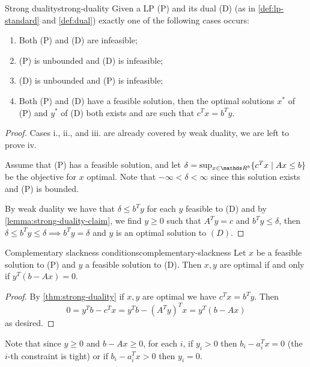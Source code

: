 \documentclass[12pt]{extarticle}
\begin{document}
\begin{theorem}{Strong duality}{strong-duality}
	Given a LP (P) and its dual (D) (as in \cref{def:lp-standard} and \cref{def:dual})
	exactly one of the following cases occurs:
	\begin{enumerate}[label=\roman*.]
		\item Both (P) and (D) are infeasible;
		\item (P) is unbounded and (D) is infeasible;
		\item (D) is unbounded and (P) is infeasible;
		\item Both (P) and (D) have a feasible solution, then the optimal solutions $x^*$ of (P)
		      and $y^*$ of (D) both exists and are such that $c^T x = b^T y$.
	\end{enumerate}
\end{theorem}

\begin{proof}
	Cases i., ii., and iii. are already covered by weak duality, we are left to prove iv.

	Assume that (P) has a feasible solution, and let
	$\delta = \sup_{x \in \R^b} \{c^T x \mid Ax \leq b\}$ be the objective for $x$ optimal.
	Note that $-\infty < \delta < \infty$ since this solution exists and (P) is bounded.

	By weak duality we have that $\delta \leq b^T y$ for each $y$ feasible to (D)
	and by \cref{lemma:strong-duality-claim}, we find $y \geq 0$ such that $A^T y = c$ and
	$b^T y \leq \delta$, then $\delta \leq b^T y \leq \delta \implies b^T y = \delta$ and $y$ is an
	optimal solution to $(D)$.
\end{proof}

\begin{theorem}{Complementary slackness conditions}{complementary-slackness}
	Let $x$ be a feasible solution to (P) and $y$ a feasible solution to (D).
	Then $x,y$ are optimal if and only if $y^T(b-Ax) = 0$.
\end{theorem}

\begin{proof}
	By \cref{thm:strong-duality} if $x, y$ are optimal we have $c^T x = b^T y$.
	Then
	\begin{equation}
		0 = y^T b - c^T x = y^T b - (A^T y)^T x = y^T (b - Ax)
	\end{equation}
	as desired.
\end{proof}

Note that since $y \geq 0$ and $b - Ax \geq 0$, for each $i$, if $y_i > 0$ then $b_i-a_i^T x = 0$
(the $i$-th constraint is tight) or if $b_i-a_i^T x > 0$ then $y_i = 0$.
\end{document}
